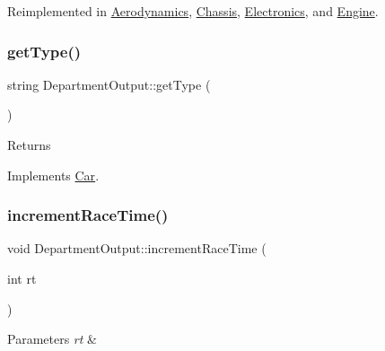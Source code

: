 Reimplemented in \hyperlink{classAerodynamics_aeee4abded0da2a826af0f3a4c0cdf991}{Aerodynamics}, \hyperlink{classChassis_a095c63aa079ebd8d7fc04f238fd1e56c}{Chassis}, \hyperlink{classElectronics_a09912c940a0a8656d97f8597b766c0eb}{Electronics}, and \hyperlink{classEngine_a5f828ac1355f02d43f8bae90fbddb131}{Engine}.

\mbox{\label{classDepartmentOutput_a9366794b5b64ed37cf37ed6443eecf01}} 
\subsubsection{\texorpdfstring{get\+Type()}{getType()}}
{\footnotesize\ttfamily string Department\+Output\+::get\+Type (\begin{DoxyParamCaption}{ }\end{DoxyParamCaption})\hspace{0.3cm}{\ttfamily [virtual]}}

\begin{DoxyReturn}{Returns}

\end{DoxyReturn}


Implements \hyperlink{classCar_ae502eb1c04753317ebdb759497fd030c}{Car}.

\mbox{\label{classDepartmentOutput_a64f6b8afd2702b4d223c4cac0909b470}} 
\subsubsection{\texorpdfstring{increment\+Race\+Time()}{incrementRaceTime()}}
{\footnotesize\ttfamily void Department\+Output\+::increment\+Race\+Time (\begin{DoxyParamCaption}\item[{int}]{rt }\end{DoxyParamCaption})\hspace{0.3cm}{\ttfamily [virtual]}}


\begin{DoxyParams}{Parameters}
{\em rt} & \\
\hline
\end{DoxyParams}


